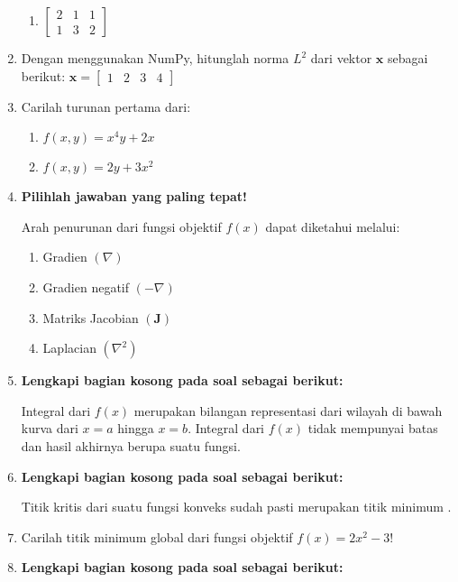 \begin{enumerate}
\begin{enumerate}[label=(\Alph*)]
            \item $\begin{bmatrix}2 & 1 & 1\\ 1 & 3 & 2\end{bmatrix}$
        \end{enumerate}
    \item Dengan menggunakan NumPy, hitunglah norma $L^2$ dari vektor $\mathbf{x}$ sebagai berikut:
    $\mathbf{x} = \begin{bmatrix}1 & 2 & 3 & 4\end{bmatrix}$
    \item Carilah turunan pertama dari:
    \begin{enumerate}[label=(\Alph*)]
        \item $f(x,y) = x^{4}y + 2x$
        \item $f(x,y) = 2y + 3x^{2}$
    \end{enumerate}
    \item \textbf{Pilihlah jawaban yang paling tepat!}
    
    Arah penurunan dari fungsi objektif $f(x)$ dapat diketahui melalui:
    \begin{enumerate}[label=(\Alph*)]
        \item Gradien $(\nabla)$
        \item Gradien negatif $(-\nabla)$
        \item Matriks Jacobian $(\mathbf{J})$
        \item Laplacian $(\nabla^2)$
    \end{enumerate}
    
    \item \textbf{Lengkapi bagian kosong pada soal sebagai berikut: }
    
    Integral \underline{\hspace{3cm}} dari $f(x)$ merupakan bilangan representasi dari wilayah di bawah kurva dari $x = a$ hingga $x = b$. Integral \underline{\hspace{3cm}} dari $f(x)$ tidak mempunyai batas dan hasil akhirnya berupa suatu fungsi.
    
    \item \textbf{Lengkapi bagian kosong pada soal sebagai berikut: }
    
    Titik kritis dari suatu fungsi konveks sudah pasti merupakan titik minimum \underline{\hspace{3cm}}.
    
    \item Carilah titik minimum global dari fungsi objektif $f(x) = 2x^{2} - 3$!
    \item \textbf{Lengkapi bagian kosong pada soal sebagai berikut: }
    

\end{enumerate}
